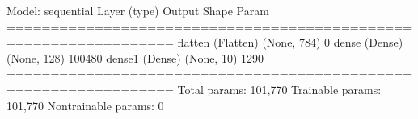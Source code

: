 \documentclass[letterpaper,10pt,french]{sphinxmanual}
\begin{document}
\begin{sphinxVerbatim}[commandchars=\\\{\}]
Model: \PYGZdq{}sequential\PYGZdq{}
\PYGZus{}\PYGZus{}\PYGZus{}\PYGZus{}\PYGZus{}\PYGZus{}\PYGZus{}\PYGZus{}\PYGZus{}\PYGZus{}\PYGZus{}\PYGZus{}\PYGZus{}\PYGZus{}\PYGZus{}\PYGZus{}\PYGZus{}\PYGZus{}\PYGZus{}\PYGZus{}\PYGZus{}\PYGZus{}\PYGZus{}\PYGZus{}\PYGZus{}\PYGZus{}\PYGZus{}\PYGZus{}\PYGZus{}\PYGZus{}\PYGZus{}\PYGZus{}\PYGZus{}\PYGZus{}\PYGZus{}\PYGZus{}\PYGZus{}\PYGZus{}\PYGZus{}\PYGZus{}\PYGZus{}\PYGZus{}\PYGZus{}\PYGZus{}\PYGZus{}\PYGZus{}\PYGZus{}\PYGZus{}\PYGZus{}\PYGZus{}\PYGZus{}\PYGZus{}\PYGZus{}\PYGZus{}\PYGZus{}\PYGZus{}\PYGZus{}\PYGZus{}\PYGZus{}\PYGZus{}\PYGZus{}\PYGZus{}\PYGZus{}\PYGZus{}\PYGZus{}
Layer (type)                 Output Shape              Param \PYGZsh{}   
=================================================================
flatten (Flatten)            (None, 784)               0         
\PYGZus{}\PYGZus{}\PYGZus{}\PYGZus{}\PYGZus{}\PYGZus{}\PYGZus{}\PYGZus{}\PYGZus{}\PYGZus{}\PYGZus{}\PYGZus{}\PYGZus{}\PYGZus{}\PYGZus{}\PYGZus{}\PYGZus{}\PYGZus{}\PYGZus{}\PYGZus{}\PYGZus{}\PYGZus{}\PYGZus{}\PYGZus{}\PYGZus{}\PYGZus{}\PYGZus{}\PYGZus{}\PYGZus{}\PYGZus{}\PYGZus{}\PYGZus{}\PYGZus{}\PYGZus{}\PYGZus{}\PYGZus{}\PYGZus{}\PYGZus{}\PYGZus{}\PYGZus{}\PYGZus{}\PYGZus{}\PYGZus{}\PYGZus{}\PYGZus{}\PYGZus{}\PYGZus{}\PYGZus{}\PYGZus{}\PYGZus{}\PYGZus{}\PYGZus{}\PYGZus{}\PYGZus{}\PYGZus{}\PYGZus{}\PYGZus{}\PYGZus{}\PYGZus{}\PYGZus{}\PYGZus{}\PYGZus{}\PYGZus{}\PYGZus{}\PYGZus{}
dense (Dense)                (None, 128)               100480    
\PYGZus{}\PYGZus{}\PYGZus{}\PYGZus{}\PYGZus{}\PYGZus{}\PYGZus{}\PYGZus{}\PYGZus{}\PYGZus{}\PYGZus{}\PYGZus{}\PYGZus{}\PYGZus{}\PYGZus{}\PYGZus{}\PYGZus{}\PYGZus{}\PYGZus{}\PYGZus{}\PYGZus{}\PYGZus{}\PYGZus{}\PYGZus{}\PYGZus{}\PYGZus{}\PYGZus{}\PYGZus{}\PYGZus{}\PYGZus{}\PYGZus{}\PYGZus{}\PYGZus{}\PYGZus{}\PYGZus{}\PYGZus{}\PYGZus{}\PYGZus{}\PYGZus{}\PYGZus{}\PYGZus{}\PYGZus{}\PYGZus{}\PYGZus{}\PYGZus{}\PYGZus{}\PYGZus{}\PYGZus{}\PYGZus{}\PYGZus{}\PYGZus{}\PYGZus{}\PYGZus{}\PYGZus{}\PYGZus{}\PYGZus{}\PYGZus{}\PYGZus{}\PYGZus{}\PYGZus{}\PYGZus{}\PYGZus{}\PYGZus{}\PYGZus{}\PYGZus{}
dense\PYGZus{}1 (Dense)              (None, 10)                1290      
=================================================================
Total params: 101,770
Trainable params: 101,770
Non\PYGZhy{}trainable params: 0
\PYGZus{}\PYGZus{}\PYGZus{}\PYGZus{}\PYGZus{}\PYGZus{}\PYGZus{}\PYGZus{}\PYGZus{}\PYGZus{}\PYGZus{}\PYGZus{}\PYGZus{}\PYGZus{}\PYGZus{}\PYGZus{}\PYGZus{}\PYGZus{}\PYGZus{}\PYGZus{}\PYGZus{}\PYGZus{}\PYGZus{}\PYGZus{}\PYGZus{}\PYGZus{}\PYGZus{}\PYGZus{}\PYGZus{}\PYGZus{}\PYGZus{}\PYGZus{}\PYGZus{}\PYGZus{}\PYGZus{}\PYGZus{}\PYGZus{}\PYGZus{}\PYGZus{}\PYGZus{}\PYGZus{}\PYGZus{}\PYGZus{}\PYGZus{}\PYGZus{}\PYGZus{}\PYGZus{}\PYGZus{}\PYGZus{}\PYGZus{}\PYGZus{}\PYGZus{}\PYGZus{}\PYGZus{}\PYGZus{}\PYGZus{}\PYGZus{}\PYGZus{}\PYGZus{}\PYGZus{}\PYGZus{}\PYGZus{}\PYGZus{}\PYGZus{}\PYGZus{}
\end{sphinxVerbatim}
\end{document}
